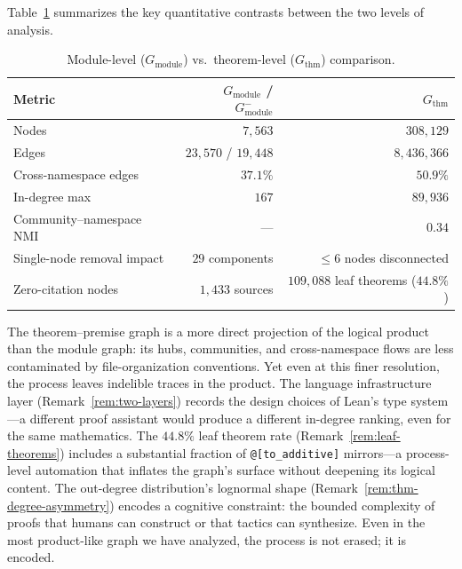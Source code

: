 \medskip

Table~\ref{tab:thm-vs-module} summarizes the key quantitative contrasts between the two levels of analysis.

\begin{table}[ht]
\centering
\caption{Module-level ($G_{\mathrm{module}}$) vs.\ theorem-level ($G_{\mathrm{thm}}$) comparison.}
\label{tab:thm-vs-module}
\begin{tabular}{lrr}
\toprule
Metric & $G_{\mathrm{module}}$ / $G_{\mathrm{module}}^{-}$ & $G_{\mathrm{thm}}$ \\
\midrule
Nodes                        & $7{,}563$          & $308{,}129$ \\
Edges                        & $23{,}570$ / $19{,}448$ & $8{,}436{,}366$ \\
Cross-namespace edges         & $37.1\%$           & $50.9\%$ \\
In-degree max                & $167$              & $89{,}936$ \\
Community--namespace NMI     & ---                & $0.34$ \\
Single-node removal impact   & $29$ components    & $\le 6$ nodes disconnected \\
Zero-citation nodes          & $1{,}433$ sources  & $109{,}088$ leaf theorems ($44.8\%$) \\
\bottomrule
\end{tabular}
\end{table}

The theorem--premise graph is a more direct projection of the logical product than the module graph: its hubs, communities, and cross-namespace flows are less contaminated by file-organization conventions. Yet even at this finer resolution, the process leaves indelible traces in the product. The language infrastructure layer (Remark~\ref{rem:two-layers}) records the design choices of Lean's type system---a different proof assistant would produce a different in-degree ranking, even for the same mathematics. The $44.8\%$ leaf theorem rate (Remark~\ref{rem:leaf-theorems}) includes a substantial fraction of \texttt{@[to\_additive]} mirrors---a process-level automation that inflates the graph's surface without deepening its logical content. The out-degree distribution's lognormal shape (Remark~\ref{rem:thm-degree-asymmetry}) encodes a cognitive constraint: the bounded complexity of proofs that humans can construct or that tactics can synthesize. Even in the most product-like graph we have analyzed, the process is not erased; it is encoded.

